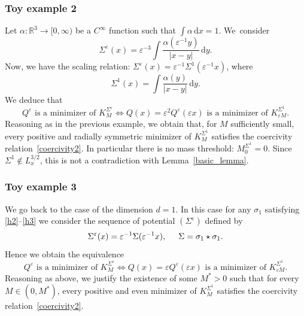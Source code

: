 \documentclass[JEP,XML,SOM,NoEqCountersInSection,NoFloatCountersInSection,Unicode,published]{cedram}
\theoremstyle{definition}
\let\ds\displaystyle
\newcommand{\ud}{\, {\mathrm{d}}}
\begin{document}
\subsubsection*{Toy example 2}
Let $\alpha:\mathbb R^3\to [0,\infty)$ be a $C^\infty$ function such that $\int \alpha\ud x=1$. We~consider
\[
\Sigma^{\varepsilon}(x)=\varepsilon^{-3}\ds\int \ds\frac{\alpha(\varepsilon^{-1}y)}{|x-y|}\ud y.
\]
Now, we have the scaling relation: $\Sigma^{\varepsilon}(x)=\varepsilon^{-1}\Sigma^{1}(\varepsilon^{-1}x)$, where
\[
\Sigma^{1}(x)=\ds\int \ds\frac{\alpha(y)}{|x-y|}\ud y.
\]
We deduce that
\[
Q^{\varepsilon} \text{ is a minimizer of } K_{M}^{\Sigma^{\varepsilon}} \iff Q(x)=\varepsilon^{2}Q^{\varepsilon}(\varepsilon x) \text{ is a minimizer of } K_{\varepsilon M}^{\Sigma^{1}}.
\]
Reasoning as in the previous example, we obtain that, for $M$ sufficiently small, every positive and radially symmetric minimizer of $K_{M}^{\Sigma^{1}}$ satisfies the coercivity relation~\eqref{coercivity2}. In particular there is no mass threshold: $M_{0}^{\Sigma^{1}}=0$. Since $\Sigma^{1}\notin L_{x}^{3/2}$, this is not a contradiction with Lemma~\ref{basic_lemma}.

\subsubsection*{Toy example 3}
We go back to the case of the dimension $d=1$. In this case for any $\sigma_{1}$ satisfying \eqref{h2}--\eqref{h3} we consider the sequence of potential $(\Sigma^{\varepsilon})$ defined by
\[
\Sigma^{\varepsilon}(x)=\varepsilon^{-1}\Sigma(\varepsilon^{-1}x), \hspace{0.5cm} \Sigma=\sigma_{1}\star\sigma_{1}.
\]
Hence we obtain the equivalence
\[
Q^{\varepsilon} \text{ is a minimizer of } K_{M}^{\Sigma^{\varepsilon}} \iff Q(x)=\varepsilon Q^{\varepsilon}(\varepsilon x) \text{ is a minimizer of } K_{\varepsilon M}^{\Sigma^{1}}.
\]
Reasoning as above, we justify the existence of some $M^{*}>0$ such that for every $M\in(0,M^{*})$, every positive and even minimizer of $K_{M}^{\Sigma^{1}}$ satisfies the coercivity relation~\eqref{coercivity2}.
\end{document}

